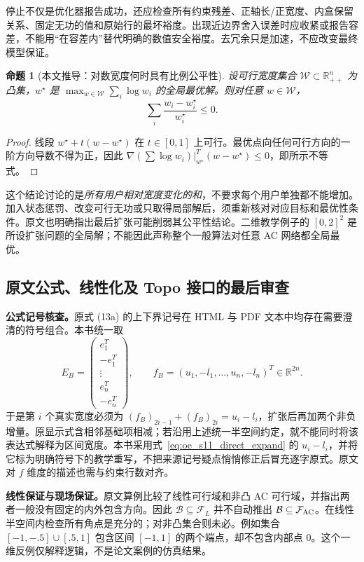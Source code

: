 \documentclass[UTF8,11pt,fontset=fandol,openany,oneside]{ctexbook}
\newcommand{\R}{\mathbb{R}}
\newtheorem{proposition}[theorem]{命题}
\theoremstyle{definition}
\theoremstyle{remark}
\numberwithin{equation}{chapter}
\begin{document}
停止不仅是优化器报告成功，还应检查所有约束残差、正轴长/正宽度、内盒保留关系、固定无功的值和原始行的最坏裕度。出现近边界舍入误差时应收紧或报告容差，不能用“在容差内”替代明确的数值安全裕度。去冗余只是加速，不应改变最终模型保证。

\begin{proposition}[本文推导：对数宽度何时具有比例公平性]
设可行宽度集合 $\mathcal W\subset\R_{++}^n$ 为凸集，$w^\star$ 是
$\max_{w\in\mathcal W}\sum_i\log w_i$ 的全局最优解。则对任意
$w\in\mathcal W$，
\begin{equation}
 \sum_i\frac{w_i-w_i^\star}{w_i^\star}\le0.
 \label{eq:oe_s11_fairness}
\end{equation}
\end{proposition}
\begin{proof}
线段 $w^\star+t(w-w^\star)$ 在 $t\in[0,1]$ 上可行。最优点向任何可行方向的一阶方向导数不得为正，因此
$\nabla(\sum\log w_i)|_{w^\star}^T(w-w^\star)\le0$，即所示不等式。
\end{proof}

这个结论讨论的是\emph{所有用户相对宽度变化的和}，不要求每个用户单独都不能增加。加入状态惩罚、改变可行无功或只取得局部解后，须重新核对对应目标和最优性条件。原文也明确指出最后扩张可能削弱其公平性结论。二维教学例子的 $[0,2]^2$ 是所设扩张问题的全局解；不能因此声称整个一般算法对任意 AC 网络都全局最优。

\subsection{原文公式、线性化及 Topo 接口的最后审查}

\textbf{公式记号核查。}原式 (13a) 的上下界记号在 HTML 与 PDF 文本中均存在需要澄清的符号组合。本书统一取
\[
 E_B=\begin{pmatrix}e_1^T\\-e_1^T\\\vdots\\e_n^T\\-e_n^T\end{pmatrix},\qquad
 f_B=(u_1,-l_1,\ldots,u_n,-l_n)^T\in\R^{2n}.
\]
于是第 $i$ 个真实宽度必须为 $(f_B)_{2i-1}+(f_B)_{2i}=u_i-l_i$，扩张后再加两个非负增量。原显示式含相邻基础项相减；若沿用上述统一半空间约定，就不能同时将该表达式解释为区间宽度。本书采用式~\eqref{eq:oe_s11_direct_expand} 的 $u_i-l_i$，并将它标为明确符号下的教学重写，不把来源记号疑点悄悄修正后冒充逐字原式。原文对 $f$ 维度的描述也需与约束行数对齐。

\textbf{线性保证与现场保证。}原文算例比较了线性可行域和非凸 AC 可行域，并指出两者一般没有固定的内外包含方向。因此
$\mathcal B\subseteq\mathcal F_L$ 并不自动推出
$\mathcal B\subseteq\mathcal F_{\rm AC}$。在线性半空间内检查所有角点是充分的；对非凸集合则未必。例如集合
$[-1,-.5]\cup[.5,1]$ 包含区间 $[-1,1]$ 的两个端点，却不包含内部点 0。这个一维反例仅解释逻辑，不是论文案例的仿真结果。
\end{document}
